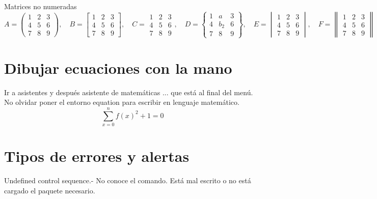 \documentclass[a4paper, 12pt]{article}
\begin{document}
	Matrices no numeradas
	\begin{equation*}
		A = 
		\begin{pmatrix}
			1 & 2 & 3 \\
			4 & 5 & 6 \\
			7 & 8 & 9
		\end{pmatrix}, \quad
		B = 
		\begin{bmatrix}
			1 & 2 & 3 \\
			4 & 5 & 6 \\
			7 & 8 & 9
		\end{bmatrix}, \quad
		C = 
		\begin{matrix}
		1 & 2 & 3 \\
		4 & 5 & 6 \\
		7 & 8 & 9
		\end{matrix}, \quad
		D = 
		\begin{Bmatrix}
		1 & a & 3 \\
		4 & b_2 & 6 \\
		7 & 8 & 9
		\end{Bmatrix}, \quad
		E = 
		\begin{vmatrix}
		1 & 2 & 3 \\
		4 & 5 & 6 \\
		7 & 8 & 9
		\end{vmatrix}, \quad
		F = 
		\begin{Vmatrix}
		1 & 2 & 3 \\
		4 & 5 & 6 \\
		7 & 8 & 9
		\end{Vmatrix}
	\end{equation*} %
	
	\section{Dibujar ecuaciones con la mano}
	Ir a asistentes y después asistente de matemáticas ... que está al final del menú.
	No olvidar poner el entorno equation para escribir en lenguaje matemático.
	\begin{equation}
		\sum _{x=0}^{n}f{\left(x\right)}^{2}+1=0
	\end{equation}
	
	\section{Tipos de errores y alertas}
	
		Undefined control sequence.- No conoce el comando. Está mal escrito o no está cargado el paquete necesario.
	
\end{document}
